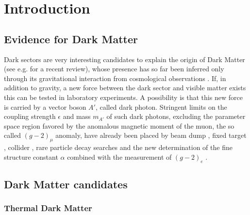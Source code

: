 

\chapter{Introduction} %

\label{chapter6}


\section{Evidence for Dark Matter}
\label{chapter1:sec:dm-evidence}

Dark sectors are very interesting candidates to explain the origin of Dark Matter (see e.g. \cite{mb} for a recent review), whose presence has 
so far been inferred only through its gravitational interaction from cosmological observations \cite{hooper}. 
If, in addition to gravity, a new force between the dark sector and visible matter exists \cite{prw, pospelov} this can be tested in laboratory experiments. A possibility is that this new force is carried by a vector boson $A'$, called dark photon.
Stringent limits on the coupling strength $\epsilon$ and mass $m_{A'}$ of such dark photons, excluding the parameter space region favored by the anomalous magnetic moment of the muon, the so called $(g-2)_{\mu}$ anomaly, have already been placed by beam dump \cite{jdb, charm, rio, e137, konaka, bross, dav,  ath, nomad, e787, essig1, blum,sg1, blum1, sarah1}, fixed target \cite{apex,merkel,merkel1}, collider \cite{babar, curt, babar1}, rare particle decay searches \cite{sindrum, kloe, sg2, kloe2, wasa, hades, phenix, e949, na48, pol, kloe3} and the new determination of the fine structure constant $\alpha$ combined with the measurement of $(g-2)_e$ \cite{Parker191,PhysRevLett.100.120801}. 

\section{Dark Matter candidates}
\label{chapter1:sec:dm-candidates}

\subsection{Thermal Dark Matter}
\label{chapter1:sec:dm-thermal}

